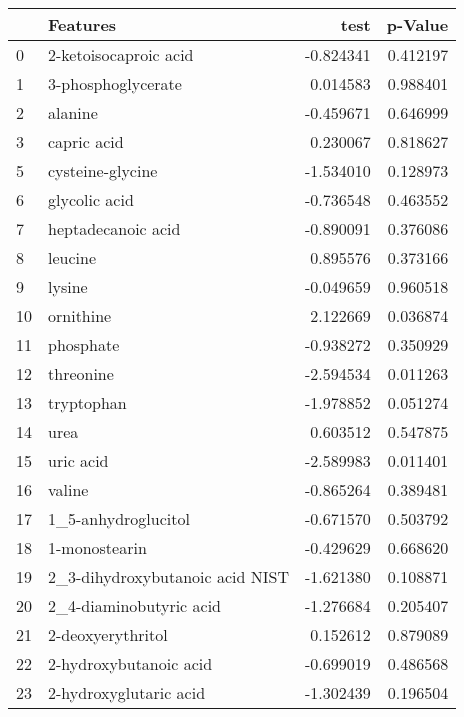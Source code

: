 \begin{tabular}{llrr}
\toprule
{} &                           Features &      test &   p-Value \\
\midrule
0   &              2-ketoisocaproic acid & -0.824341 &  0.412197 \\
1   &                 3-phosphoglycerate &  0.014583 &  0.988401 \\
2   &                            alanine & -0.459671 &  0.646999 \\
3   &                        capric acid &  0.230067 &  0.818627 \\
5   &                   cysteine-glycine & -1.534010 &  0.128973 \\
6   &                      glycolic acid & -0.736548 &  0.463552 \\
7   &                 heptadecanoic acid & -0.890091 &  0.376086 \\
8   &                            leucine &  0.895576 &  0.373166 \\
9   &                             lysine & -0.049659 &  0.960518 \\
10  &                          ornithine &  2.122669 &  0.036874 \\
11  &                          phosphate & -0.938272 &  0.350929 \\
12  &                          threonine & -2.594534 &  0.011263 \\
13  &                         tryptophan & -1.978852 &  0.051274 \\
14  &                               urea &  0.603512 &  0.547875 \\
15  &                          uric acid & -2.589983 &  0.011401 \\
16  &                             valine & -0.865264 &  0.389481 \\
17  &                1\_5-anhydroglucitol & -0.671570 &  0.503792 \\
18  &                      1-monostearin & -0.429629 &  0.668620 \\
19  &    2\_3-dihydroxybutanoic acid NIST & -1.621380 &  0.108871 \\
20  &            2\_4-diaminobutyric acid & -1.276684 &  0.205407 \\
21  &                  2-deoxyerythritol &  0.152612 &  0.879089 \\
22  &             2-hydroxybutanoic acid & -0.699019 &  0.486568 \\
23  &             2-hydroxyglutaric acid & -1.302439 &  0.196504 \\

\end{tabular}
